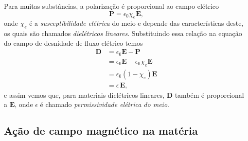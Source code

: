 Para muitas subst\^ancias, a polariza\c{c}\~ao \'e proporcional ao campo el\'etrico
\begin{equation*}
\mathbf{P}=\epsilon_0\chi_e\mathbf{E},
\end{equation*}
onde $\chi_e$ \'e a \textit{susceptibilidade el\'etrica} do meio e depende das caracter\'isticas deste, os quais s\~ao chamados \textit{diel\'etricos lineares}. Substituindo essa rela\c{c}\~ao na equa\c{c}\~ao do campo de desnidade de fluxo el\'etrico temos
\begin{align}\label{eq.D_funcao_E}\nonumber
\mathbf{D}&=\epsilon_0\mathbf{E}-\mathbf{P}\\\nonumber
&=\epsilon_0\mathbf{E}-\epsilon_0\chi_e\mathbf{E}\\\nonumber
&=\epsilon_0(1-\chi_e)\mathbf{E}\\
&=\epsilon\,\mathbf{E},
\end{align}
e assim vemos que, para materiais diel\'etricos lineares, $\mathbf{D}$ tamb\'em \'e proporcional a $\mathbf{E}$, onde $\epsilon$ \'e chamado \textit{permissividade el\'etrica do meio}.

\subsection{A\c{c}\~ao de campo magn\'etico na mat\'eria}


